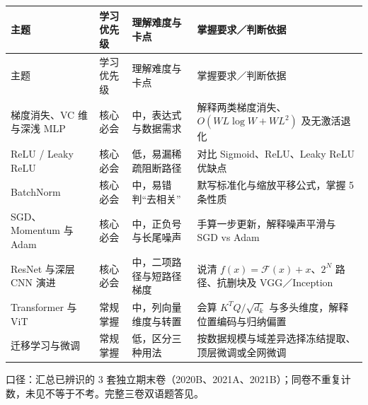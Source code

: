 \begingroup\small\setlength{\tabcolsep}{3pt}\renewcommand{\arraystretch}{1.22}
\begin{longtable}{@{}>{\raggedright\arraybackslash}p{}>{\raggedright\arraybackslash}p{}>{\raggedright\arraybackslash}p{}>{\raggedright\arraybackslash}p{}@{}}
\toprule
主题 & 学习优先级 & 理解难度与卡点 & 掌握要求／判断依据 \\
\midrule\endfirsthead
主题 & 学习优先级 & 理解难度与卡点 & 掌握要求／判断依据 \\
\midrule\endhead
\bottomrule\endfoot
梯度消失、VC 维与深浅 MLP & 核心必会 & 中，表达式与数据需求 & 解释两类梯度消失、$O(WL\log W+WL^2)$ 及无激活退化 \\
ReLU / Leaky ReLU & 核心必会 & 低，易漏稀疏阻断路径 & 对比 Sigmoid、ReLU、Leaky ReLU 优缺点 \\
BatchNorm & 核心必会 & 中，易错判“去相关” & 默写标准化与缩放平移公式，掌握 5 条性质 \\
SGD、Momentum 与 Adam & 核心必会 & 中，正负号与长尾噪声 & 手算一步更新，解释噪声平滑与 SGD vs Adam \\
ResNet 与深层 CNN 演进 & 核心必会 & 中，二项路径与短路径梯度 & 说清 $f(x)=\mathcal{F}(x)+x$、$2^N$ 路径、抗删块及 VGG／Inception \\
Transformer 与 ViT & 常规掌握 & 中，列向量维度与转置 & 会算 $K^TQ/\sqrt{d_k}$ 与多头维度，解释位置编码与归纳偏置 \\
迁移学习与微调 & 常规掌握 & 低，区分三种用法 & 按数据规模与域差异选择冻结提取、顶层微调或全网微调 \\
\end{longtable}\endgroup



口径：汇总已辨识的 3 套独立期末卷（2020B、2021A、2021B）；同卷不重复计数，未见不等于不考。完整三卷双语题答见。

